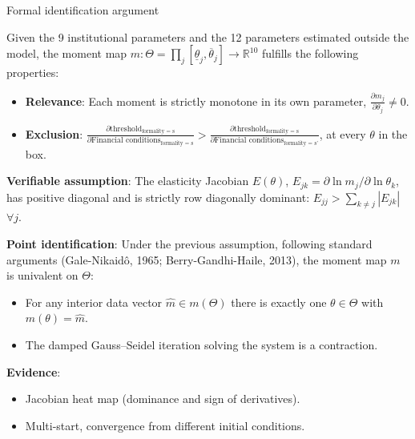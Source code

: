 \documentclass[11pt,aspectratio=169]{beamer}
\begin{document}
\begin{frame}[noframenumbering]{Formal identification argument}

Given the 9 institutional parameters and the 12 parameters estimated outside the model, the moment map $m:\Theta =\prod_{j}[\underline\theta_{j},\overline\theta_{j}] \to\mathbb{R}^{10}$ fulfills the following properties:

\begin{itemize}
    \item \textbf{Relevance}: Each moment is strictly monotone in its own parameter, $\frac{\partial m_j}{\partial \theta_j} \neq 0$.
    \item \textbf{Exclusion}: $\frac{\partial \text{threshold}_{\text{formality = s}}}{\partial \text{Financial conditions}_{\text{formality = s}}} > \frac{\partial \text{threshold}_{\text{formality = s}}}{\partial \text{Financial conditions}_{\text{formality = s'}}}$, at every $\theta$ in the box.
\end{itemize}
\vspace{4mm}

\textbf{Verifiable assumption}: The elasticity Jacobian $E(\theta)$, $E_{jk}=\partial\ln m_{j}/\partial\ln\theta_{k}$, has
positive diagonal and is strictly row diagonally
dominant: $E_{jj}>\sum_{k\neq j}|E_{jk}|$ $\forall j$.
\vspace{4mm}

\textbf{Point identification}: Under the previous assumption, following standard arguments (Gale-Nikaidô, 1965; Berry-Gandhi-Haile, 2013), the moment map $m$ is univalent on $\Theta$:
\begin{itemize}
    \item For any interior data vector $\hat m\in m(\Theta)$ there is exactly one $\theta\in\Theta$ with $m(\theta)=\hat m$.
    \item The damped Gauss--Seidel iteration solving the system is a contraction.
\end{itemize}
\vspace{4mm}

\textbf{Evidence}: 
\begin{itemize}
    \item Jacobian heat map (dominance and sign of derivatives). 
    \item Multi-start, convergence from different initial conditions. 
\end{itemize}

\end{frame}
\end{document}
